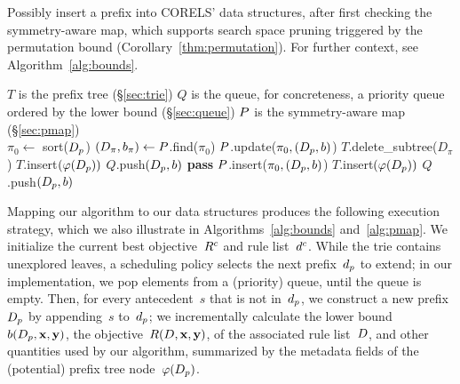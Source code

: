 \begin{algorithm}[t!]
  \caption{Possibly insert a prefix into CORELS' data structures, after first
  checking the symmetry-aware map, which supports search space pruning
  triggered by the permutation bound (Corollary~\ref{thm:permutation}).
  For further context, see Algorithm~\ref{alg:bounds}.}
\label{alg:pmap}
\begin{algorithmic}
\State $T$ is the prefix tree (\S\ref{sec:trie})
\State $Q$ is the queue, for concreteness, a priority queue ordered by the lower bound (\S\ref{sec:queue})
\State $P$ is the symmetry-aware map (\S\ref{sec:pmap}) \\

    \State $\pi_0 \gets$ sort($D_p$) 
    \State $(D_\pi, b_\pi) \gets P$.find($\pi_0$) 
         
            \State $P$.update($\pi_0, (D_p, b)$) 
            \State $T$.delete\_subtree($D_\pi$) 
            \State $T$.insert$(\varphi(D_p))$ 
            \State $Q$.push$(D_p, b)$ 
        \Else
            \State \textbf{pass} 
        \EndIf
    \Else
        \State $P$.insert($\pi_0, (D_p, b)$) 
        \State $T$.insert$(\varphi(D_p))$ 
        \State $Q$.push$(D_p, b)$ 
    \EndIf
\EndFunction
\end{algorithmic}
\end{algorithm}

Mapping our algorithm to our data structures produces the following execution strategy,
which we also illustrate in Algorithms~\ref{alg:bounds} and~\ref{alg:pmap}.
%
We initialize the current best objective~${R^c}$ and rule list~$d^c$.
%
While the trie contains unexplored leaves, a scheduling policy selects the next prefix~$d_p$
to extend; in our implementation, we pop elements from a (priority) queue, until the queue is empty.
%
Then, for every antecedent~$s$ that is not in~$d_p$,
we construct a new prefix~$D_p$ by appending~$s$ to~$d_p$;
we incrementally calculate the lower bound~$b(D_p, \mathbf{x}, \mathbf{y})$,
the objective~$R({D}, \mathbf{x}, \mathbf{y})$, of the associated rule list~${D}$,
and other quantities used by our algorithm, summarized by the metadata fields of
the (potential) prefix tree node~$\varphi(D_p)$.

